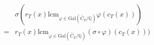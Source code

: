\documentclass[preview]{standalone}
\begin{document}
\begin{center}
\begin{align*} &\sigma(r_T(x) \text{lcm}_{\varphi \in \text{Gal}\left(\widetilde{C_T}/\mathbb{Q}\right)} \varphi(c_T(x))) \\ = & r_T(x)\text{lcm}_{\varphi \in \text{Gal}\left(\widetilde{C_T}/\mathbb{Q}\right)} (\sigma \circ \varphi)(c_T(x)))  \end{align*}
\end{center}
\end{document}
